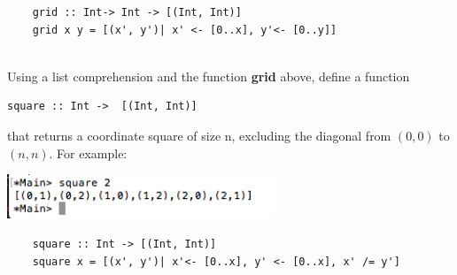 \documentclass{article}
\begin{document}
\begin{Answer}
  \begin{lstlisting}
    grid :: Int-> Int -> [(Int, Int)]
    grid x y = [(x', y')| x' <- [0..x], y'<- [0..y]]
    
  \end{lstlisting}
  
  \end{Answer}
\begin{Exercise}
Using a list comprehension and the function \textbf{grid} above, define a function 
\begin{lstlisting}
square :: Int ->  [(Int, Int)]
\end{lstlisting}
that returns a coordinate square of size n, excluding the diagonal from $(0,0)$ to $(n, n)$. For example: 
\begin{center}
	\includegraphics[width=8cm]{img/02.png}
\end{center}
\end{Exercise}
\begin{Answer}
  \begin{lstlisting}
    square :: Int -> [(Int, Int)]
    square x = [(x', y')| x'<- [0..x], y' <- [0..x], x' /= y']
  \end{lstlisting}
  
  \end{Answer}
\end{document}
